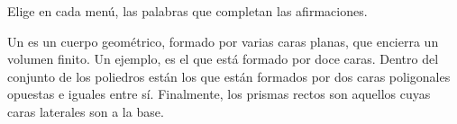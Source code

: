Elige en cada menú, las palabras que completan las afirmaciones.
\begin{center}
     \quad {} \quad {} \quad
     \quad {} \quad {} \quad
     \quad {} \quad {} \quad
     \quad {} \quad {} \quad
\end{center}

Un \fillin[poliedro][2cm] es un cuerpo geométrico, formado por varias caras planas,
que encierra un volumen finito. Un ejemplo, es el \fillin[dodecaedro][3cm]
que está formado por doce caras. Dentro del conjunto de los poliedros están los \fillin[prismas][2cm]
que están formados por dos caras poligonales opuestas e iguales entre sí.
Finalmente, los prismas rectos son aquellos cuyas caras laterales son
\fillin[perpendiculares][3.5cm] a la base.
